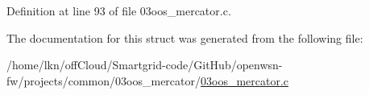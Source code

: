 Definition at line 93 of file 03oos\+\_\+mercator.\+c.



The documentation for this struct was generated from the following file\+:\begin{DoxyCompactItemize}
\item 
/home/lkn/off\+Cloud/\+Smartgrid-\/code/\+Git\+Hub/openwsn-\/fw/projects/common/03oos\+\_\+mercator/\hyperlink{03oos__mercator_8c}{03oos\+\_\+mercator.\+c}\end{DoxyCompactItemize}
